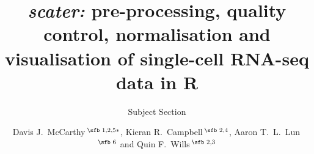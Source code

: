 \documentclass{bioinfo}
\begin{document}

\subtitle{Subject Section}

\title[scater package]{\emph{scater:} pre-processing, quality control, normalisation and visualisation of single-cell RNA-seq data in R}
\author[McCarthy \textit{et~al}.]{Davis J.~McCarthy\,$^{\text{\sfb 1,2,5}*}$, Kieran R.~Campbell\,$^{\text{\sfb 2,4}}$, Aaron T.~L.~Lun\,$^{\text{\sfb 6}}$ and Quin F.~Wills\,$^{\text{\sfb 2,3}}$}
\address{$^{\text{\sf 1}}$European Molecular Biology Laboratory - European Bioinformatics Institute (EMBL-EBI), Hinxton CB10 1SD, United Kingdom;\\
$^{\text{\sf 2}}$Wellcome Trust Centre for Human Genetics, University of Oxford,
Roosevelt Drive, Oxford OX3 7BN, United Kingdom;\\
$^{\text{\sf 3}}$Weatherall Institute for Molecular Medicine, University of Oxford, John Radcliffe Hospital, Oxford OX3 9DS, United Kingdom;\\
$^{\text{\sf 4}}$Department of Physiology, Anatomy and Genetics, University of Oxford, South Parks Road, Oxford OX1 3QX, United Kingdom;\\
$^{\text{\sf 5}}$St Vincent's Institute of Medical Research, 41 Victoria Parade, Fitzroy Victoria 3065, Australia; and \\
$^{\text{\sf 6}}$CRUK Cambridge Institute, University of Cambridge, Robinson Way, Cambridge CB2 0RE, United Kingdom.
}



\end{document}
